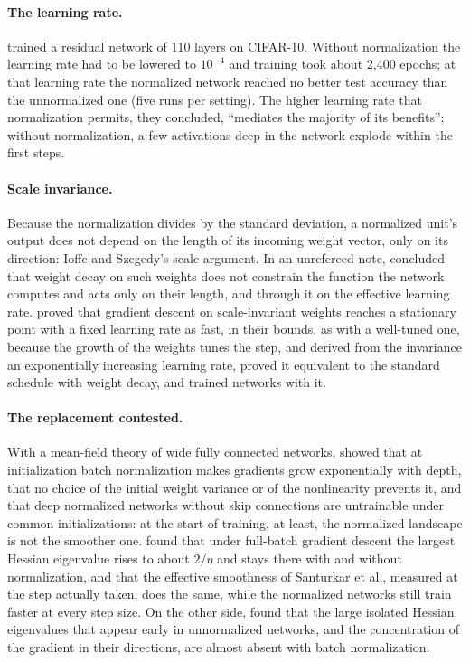 \begin{refsection}
\paragraph{The learning rate.} \Textcite{BjorckEtAl2018} trained a residual network of 110 layers on CIFAR-10. Without normalization the learning rate had to be lowered to $10^{-4}$ and training took about 2,400 epochs; at that learning rate the normalized network reached no better test accuracy than the unnormalized one (five runs per setting). The higher learning rate that normalization permits, they concluded, \enquote{mediates the majority of its benefits}; without normalization, a few activations deep in the network explode within the first steps.

\paragraph{Scale invariance.} Because the normalization divides by the standard deviation, a normalized unit's output does not depend on the length of its incoming weight vector, only on its direction: Ioffe and Szegedy's scale argument. In an unrefereed note, \textcite{vanLaarhoven2017} concluded that weight decay on such weights does not constrain the function the network computes and acts only on their length, and through it on the effective learning rate. \Textcite{AroraLiLyu2019} proved that gradient descent on scale-invariant weights reaches a stationary point with a fixed learning rate as fast, in their bounds, as with a well-tuned one, because the growth of the weights tunes the step, and \textcite{LiArora2020} derived from the invariance an exponentially increasing learning rate, proved it equivalent to the standard schedule with weight decay, and trained networks with it.

\paragraph{The replacement contested.} With a mean-field theory of wide fully connected networks, \textcite{YangEtAl2019} showed that at initialization batch normalization makes gradients grow exponentially with depth, that no choice of the initial weight variance or of the nonlinearity prevents it, and that deep normalized networks without skip connections are untrainable under common initializations: at the start of training, at least, the normalized landscape is not the smoother one. \Textcite{CohenEtAl2021} found that under full-batch gradient descent the largest Hessian eigenvalue rises to about $2/\eta$ and stays there with and without normalization, and that the effective smoothness of Santurkar et al., measured at the step actually taken, does the same, while the normalized networks still train faster at every step size. On the other side, \textcite{GhorbaniKrishnanXiao2019} found that the large isolated Hessian eigenvalues that appear early in unnormalized networks, and the concentration of the gradient in their directions, are almost absent with batch normalization.


\end{refsection}
